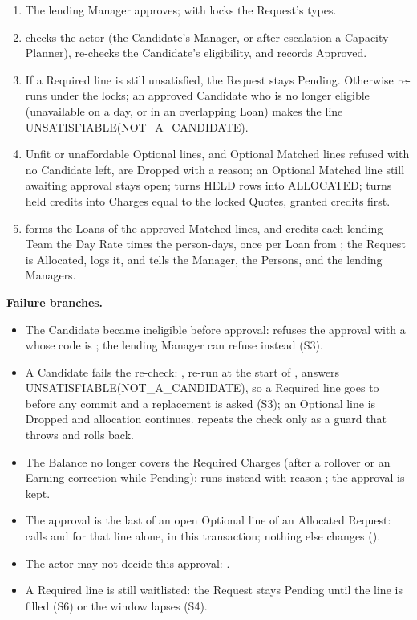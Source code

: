 \begin{enumerate}
\item The lending Manager approves;  with  locks the Request's types.
\item {} checks the actor (the Candidate's Manager, or after escalation a Capacity Planner), re-checks the Candidate's eligibility, and records Approved.
\item If a Required line is still unsatisfied, the Request stays Pending. Otherwise  re-runs  under the locks; an approved Candidate who is no longer eligible (unavailable on a day, or in an overlapping Loan) makes the line UNSATISFIABLE(NOT\_A\_CANDIDATE).
\item Unfit or unaffordable Optional lines, and Optional Matched lines refused with no Candidate left, are Dropped with a reason; an Optional Matched line still awaiting approval stays open;  turns HELD rows into ALLOCATED;  turns held credits into Charges equal to the locked Quotes, granted credits first.
\item {} forms the Loans of the approved Matched lines, and  credits each lending Team the Day Rate times the person-days, once per Loan from ; the Request is Allocated,  logs it, and  tells the Manager, the Persons, and the lending Managers.
\end{enumerate}
\par\textbf{Failure branches.}
\begin{itemize}
\item The Candidate became ineligible before approval:  refuses the approval with a  whose code is ; the lending Manager can refuse instead (S3).
\item A Candidate fails the re-check: , re-run at the start of , answers UNSATISFIABLE(NOT\_A\_CANDIDATE), so a Required line goes to  before any commit and a replacement is asked (S3); an Optional line is Dropped and allocation continues.  repeats the check only as a guard that throws  and rolls back.
\item The Balance no longer covers the Required Charges (after a rollover or an Earning correction while Pending):  runs instead with reason ; the approval is kept.
\item The approval is the last of an open Optional line of an Allocated Request:  calls  and  for that line alone, in this transaction; nothing else changes ().
\item The actor may not decide this approval: .
\item A Required line is still waitlisted: the Request stays Pending until the line is filled (S6) or the window lapses (S4).
\end{itemize}

